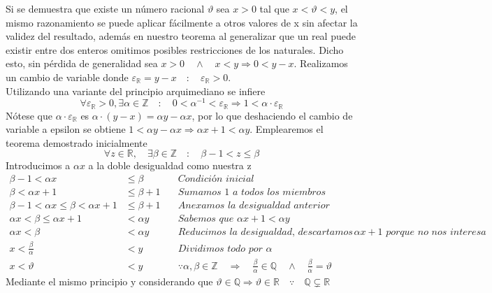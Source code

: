\documentclass{article}
\begin{document}
Si se demuestra que existe un número racional \(\vartheta\) sea \(x>0\) tal que \(x<\vartheta<y\), el mismo razonamiento se puede aplicar fácilmente a otros valores de x sin afectar la validez del resultado, además en nuestro teorema al generalizar que un real puede existir entre dos enteros omitimos posibles restricciones de los naturales. Dicho esto, sin pérdida de generalidad sea \(x > 0 \quad \land \quad x<y \Rightarrow 0 < y-x \). Realizamos un cambio de variable donde \(\varepsilon_{\mathbb{R}} = y-x \quad : \quad \varepsilon_{\mathbb{R}} > 0\). \\
Utilizando una variante del principio arquimediano se infiere \\
\[ \forall \varepsilon_{\mathbb{R}}>0, \exists \alpha \in \mathbb{Z} \quad : \quad 0 < \alpha^{-1} < \varepsilon_{\mathbb{R}} \Rightarrow 1 < \alpha \cdot \varepsilon_{\mathbb{R}} \]
Nótese que \(\alpha \cdot \varepsilon_{\mathbb{R}}\) es \( \alpha \cdot (y - x) = \alpha y - \alpha x \), por lo que deshaciendo el cambio de variable a epsilon se obtiene
\( 1 < \alpha y - \alpha x \Rightarrow \alpha x + 1 < \alpha y \). Emplearemos el teorema demostrado inicialmente
\[ \forall z \in \mathbb{R}, \quad \exists \beta \in \mathbb{Z} \quad : \quad \beta - 1 < z \leq \beta      \]
Introducimos a \( \alpha x \) a la doble desigualdad como nuestra z
\begin{align*}
    \beta - 1 < \alpha x &\leq \beta && \textit{Condición inicial} \\
    \beta < \alpha x + 1 &\leq \beta + 1 && \textit{Sumamos 1 a todos los miembros}\\
    \beta - 1 < \alpha x \leq \beta < \alpha x + 1 &\leq \beta + 1 && \textit{Anexamos la desigualdad anterior}\\
    \alpha x < \beta \leq \alpha x + 1 &< \alpha y && \textit{Sabemos que   }\alpha x+1 < \alpha y\\
    \alpha x < \beta &< \alpha y && \textit{Reducimos la desigualdad, descartamos  } \alpha x + 1 \textit{  porque no nos interesa} \\
    x < \frac{\beta}{\alpha} &< y \quad \quad && \textit{Dividimos todo por  } \alpha \\
    x < \vartheta &< y && \because \alpha, \beta \in \mathbb{Z} \quad \Rightarrow \quad \frac{\beta}{\alpha} \in \mathbb{Q} \quad \land \quad \frac{\beta}{\alpha} = \vartheta
\end{align*}
Mediante el mismo principio y considerando que \( \vartheta \in \mathbb{Q} \Rightarrow \vartheta \in \mathbb{R} \quad \because \quad \mathbb{Q} \subsetneq \mathbb{R}\)
\end{document}
